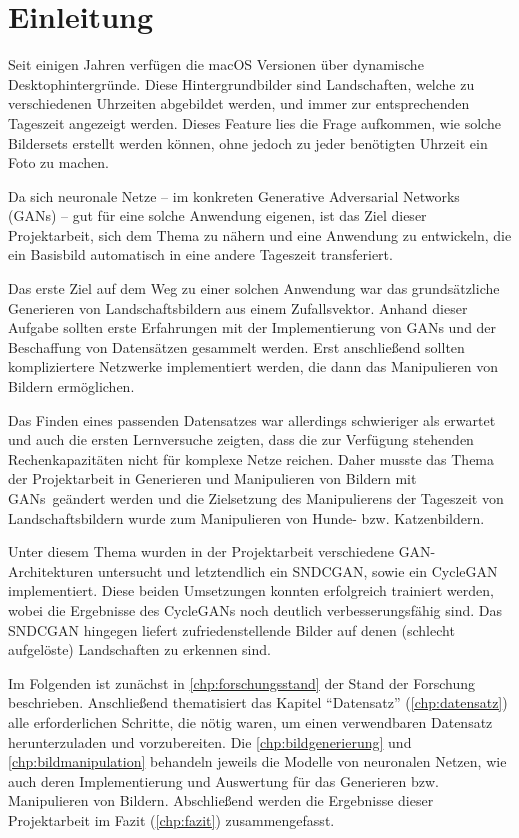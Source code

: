 \chapter{Einleitung}\label{chp:einleitung}%
\glsresetall

Seit einigen Jahren verfügen die macOS Versionen über dynamische Desktophintergründe. Diese Hintergrundbilder sind
Landschaften, welche zu verschiedenen Uhrzeiten abgebildet werden, und immer zur 
entsprechenden Tageszeit angezeigt werden. Dieses Feature lies die Frage aufkommen, wie 
solche Bildersets erstellt werden können, ohne jedoch zu jeder benötigten Uhrzeit ein Foto zu 
machen. 

Da sich neuronale Netze -- im konkreten Generative Adversarial Networks (GANs) -- gut für eine 
solche Anwendung eigenen, ist das Ziel dieser Projektarbeit, sich dem Thema zu nähern und eine 
Anwendung zu entwickeln, die ein Basisbild automatisch in eine andere Tageszeit transferiert. 

Das erste Ziel auf dem Weg zu einer solchen Anwendung war das grundsätzliche Generieren von 
Landschaftsbildern aus einem Zufallsvektor. Anhand dieser Aufgabe sollten erste Erfahrungen mit 
der Implementierung von GANs und der Beschaffung von Datensätzen gesammelt werden. Erst 
anschließend sollten kompliziertere Netzwerke implementiert werden, die dann das Manipulieren von 
Bildern ermöglichen.

Das Finden eines passenden Datensatzes war allerdings schwieriger als 
erwartet und auch die ersten Lernversuche zeigten, dass die zur Verfügung stehenden 
Rechenkapazitäten nicht für komplexe Netze reichen. Daher musste das Thema der Projektarbeit in 
\glqq Generieren und Manipulieren von Bildern mit GANs\grqq\ geändert werden und die Zielsetzung 
des Manipulierens der Tageszeit von Landschaftsbildern wurde zum Manipulieren von Hunde- bzw. 
Katzenbildern.

Unter diesem Thema wurden in der Projektarbeit verschiedene GAN-Architekturen untersucht und 
letztendlich ein SNDCGAN, sowie ein CycleGAN implementiert. Diese beiden Umsetzungen konnten 
erfolgreich trainiert werden, wobei die Ergebnisse des CycleGANs noch deutlich 
verbesserungsfähig sind. Das SNDCGAN hingegen liefert zufriedenstellende Bilder auf denen 
(schlecht aufgelöste) Landschaften zu erkennen sind.

Im Folgenden ist zunächst in \autoref{chp:forschungsstand} der Stand der Forschung beschrieben. 
Anschließend thematisiert das Kapitel \enquote{Datensatz} (\autoref{chp:datensatz}) alle 
erforderlichen Schritte, die nötig waren, um einen verwendbaren Datensatz herunterzuladen und 
vorzubereiten. Die \autoref{chp:bildgenerierung} und \ref{chp:bildmanipulation} behandeln 
jeweils die Modelle von neuronalen Netzen, wie auch deren Implementierung und Auswertung für 
das Generieren bzw. Manipulieren von Bildern. Abschließend werden die Ergebnisse dieser 
Projektarbeit im Fazit (\autoref{chp:fazit}) zusammengefasst.